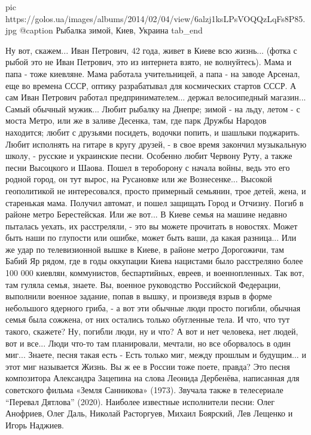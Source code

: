 		 pic https://golos.ua/images/albums/2014/02/04/view/6alzj1ksLPsVOQQzLqFs8P85.jpg
		 @caption Рыбалка зимой, Киев, Украина
  tab_end
\fi

Ну вот, скажем...  Иван Петрович, 42 года, живет в Киеве всю жизнь... (фотка с
рыбой это не Иван Петрович, это из интернета взято, не волнуйтесь). Мама и папа
- тоже киевляне.  Мама работала учительницей, а папа - на заводе Арсенал, еще
во времена СССР, оптику разрабатывал для космических стартов СССР.  А сам Иван
Петрович работал предпринимателем... держал велосипедный магазин... Самый
обычный мужик...  Любит рыбалку на Днепре; зимой - на льду, летом - с моста
Метро, или же в заливе Десенка, там, где парк Дружбы Народов находится; любит с
друзьями посидеть, водочки попить, и шашлыки поджарить.  Любит исполнять на
гитаре в кругу друзей, - в свое время закончил музыкальную школу, - русские и
украинские песни.  Особенно любит Червону Руту, а также песни Высоцкого и
Шаова.  Пошел в тероборону с начала войны, ведь это его родной город, он тут
вырос, на Русановке или же Вознесенке... Высокой геополитикой не интересовался,
просто примерный семьянин, трое детей, жена, и старенькая мама.  Получил
автомат, и пошел защищать Город и Отчизну. Погиб в районе метро Берестейская.
Или же вот... В Киеве семья на машине недавно пыталась уехать, их расстреляли,
- это вы можете прочитать в новостях. Может быть наши по глупости или ошибке,
может быть ваши, да какая разница... Или же удар по телевизионной вышке в
Киеве, в районе метро Дорогожичи, там Бабий Яр рядом, где в годы оккупации
Киева нацистами было расстреляно более 100 000 киевлян, коммунистов,
беспартийных, евреев, и военнопленных. Так вот, там гуляла семья, знаете. Вы,
военное руководство Российской Федерации, выполнили военное задание, попав в
вышку, и произведя взрыв в форме небольшого ядерного гриба, - а вот эти обычные
люди просто погибли, обычная семья была сожжена, от них остались только
обугленные тела.  И что, что тут такого, скажете? Ну, погибли люди, ну и что? А
вот и нет человека, нет людей, вот и все... Люди что-то там планировали,
мечтали, но все оборвалось в один миг...  Знаете, песня такая есть - Есть
только миг, между прошлым и будущим...  и этот миг называется Жизнь. Вы ж ее в
России тоже поете, правда?  Это песня композитора Александра Зацепина на слова
Леонида Дербенёва, написанная для советского фильма «Земля Санникова» (1973).
Звучала также в телесериале \enquote{Перевал Дятлова} (2020). Наиболее
известные исполнители песни: Олег Анофриев, Олег Даль, Николай Расторгуев,
Михаил Боярский, Лев Лещенко и Игорь Наджиев.

